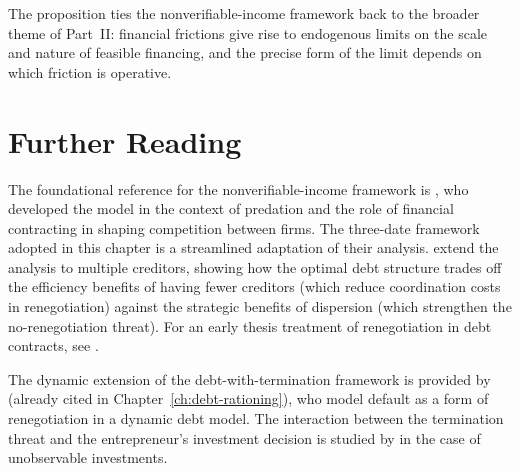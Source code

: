 \documentclass[11pt,a4paper,oneside]{book}
\theoremstyle{plain}
\theoremstyle{definition}
\theoremstyle{remark}
\numberwithin{equation}{chapter}
\begin{document}
The proposition ties the nonverifiable-income framework back to the broader theme of Part~II: financial frictions give rise to endogenous limits on the scale and nature of feasible financing, and the precise form of the limit depends on which friction is operative.

\section{Further Reading}
\label{sec:NV-further-reading}

The foundational reference for the nonverifiable-income framework is \citet{BoltonScharfstein1990}, who developed the model in the context of predation and the role of financial contracting in shaping competition between firms.
The three-date framework adopted in this chapter is a streamlined adaptation of their analysis.
\citet{BoltonScharfstein1996} extend the analysis to multiple creditors, showing how the optimal debt structure trades off the efficiency benefits of having fewer creditors (which reduce coordination costs in renegotiation) against the strategic benefits of dispersion (which strengthen the no-renegotiation threat).
For an early thesis treatment of renegotiation in debt contracts, see \citet{Gromb1994}.

The dynamic extension of the debt-with-termination framework is provided by \citet{HartMoore1998} (already cited in Chapter~\ref{ch:debt-rationing}), who model default as a form of renegotiation in a dynamic debt model.
The interaction between the termination threat and the entrepreneur's investment decision is studied by \citet{PovelRaith2004} in the case of unobservable investments.
\end{document}

